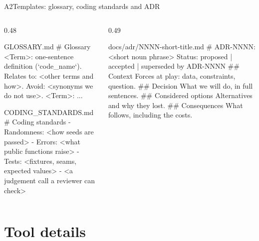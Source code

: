 \begin{frame}[fragile,source={Nygard (2011) · Pocock (2026), domain-modeling ADR format; code-review}]{A2\enspace Templates: glossary, coding standards and ADR}
  \begin{columns}[T,onlytextwidth]
    \begin{column}{0.48\textwidth}
\begin{codefile}[basicstyle=\ttfamily\fontsize{7}{8.4}\selectfont]{GLOSSARY.md}
# Glossary
<Term>: one-sentence definition (`code_name`).
  Relates to: <other terms and how>.
  Avoid: <synonyms we do not use>.
<Term>: ...
\end{codefile}
      \vskip2mm
\begin{codefile}[basicstyle=\ttfamily\fontsize{7}{8.4}\selectfont]{CODING\_STANDARDS.md}
# Coding standards
- Randomness: <how seeds are passed>
- Errors: <what public functions raise>
- Tests: <fixtures, seams, expected values>
- <a judgement call a reviewer can check>
\end{codefile}
    \end{column}
    \begin{column}{0.49\textwidth}
\begin{codefile}[basicstyle=\ttfamily\fontsize{7}{8.4}\selectfont]{docs/adr/NNNN-short-title.md}
# ADR-NNNN: <short noun phrase>
Status: proposed | accepted |
        superseded by ADR-NNNN
## Context
Forces at play: data, constraints, question.
## Decision
What we will do, in full sentences.
## Considered options
Alternatives and why they lost.
## Consequences
What follows, including the costs.
\end{codefile}
    \end{column}
  \end{columns}
\end{frame}


\section[Tool details]{Tool details}

